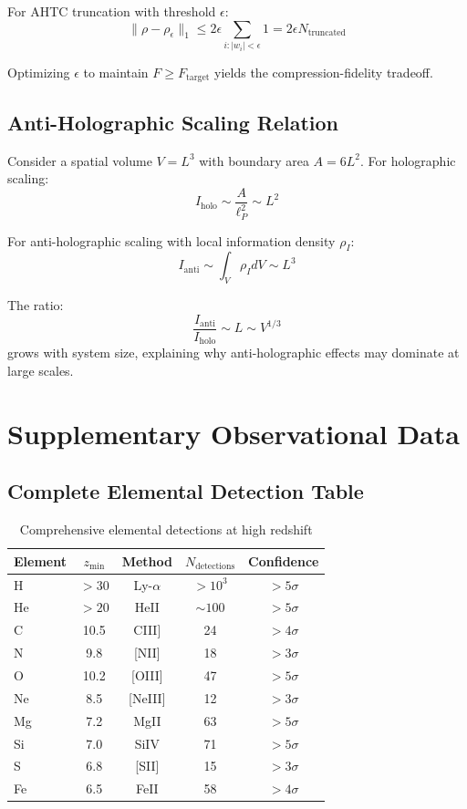 \documentclass[twocolumn,aps,prd,superscriptaddress,nofootinbib]{revtex4-2}
\begin{document}
For AHTC truncation with threshold $\epsilon$:
\begin{equation}
\|\rho - \rho_\epsilon\|_1 \leq 2\epsilon \sum_{i : |w_i| < \epsilon} 1 = 2\epsilon N_{\text{truncated}}
\end{equation}

Optimizing $\epsilon$ to maintain $F \geq F_{\text{target}}$ yields the compression-fidelity tradeoff.

\subsection{Anti-Holographic Scaling Relation}

Consider a spatial volume $V = L^3$ with boundary area $A = 6L^2$. For holographic scaling:
\begin{equation}
I_{\text{holo}} \sim \frac{A}{\ell_P^2} \sim L^2
\end{equation}

For anti-holographic scaling with local information density $\rho_I$:
\begin{equation}
I_{\text{anti}} \sim \int_V \rho_I dV \sim L^3
\end{equation}

The ratio:
\begin{equation}
\frac{I_{\text{anti}}}{I_{\text{holo}}} \sim L \sim V^{1/3}
\end{equation}
grows with system size, explaining why anti-holographic effects may dominate at large scales.

\section{Supplementary Observational Data}

\subsection{Complete Elemental Detection Table}

\begin{table}[htbp]
\centering
\caption{Comprehensive elemental detections at high redshift}
\label{tab:complete_elements}
\begin{tabular}{lcccc}
\toprule
Element & $z_{\min}$ & Method & $N_{\text{detections}}$ & Confidence \\
\midrule
H & $>30$ & Ly-$\alpha$ & $>10^3$ & $>5\sigma$ \\
He & $>20$ & HeII & $\sim100$ & $>5\sigma$ \\
C & 10.5 & CIII] & 24 & $>4\sigma$ \\
N & 9.8 & [NII] & 18 & $>3\sigma$ \\
O & 10.2 & [OIII] & 47 & $>5\sigma$ \\
Ne & 8.5 & [NeIII] & 12 & $>3\sigma$ \\
Mg & 7.2 & MgII & 63 & $>5\sigma$ \\
Si & 7.0 & SiIV & 71 & $>5\sigma$ \\
S & 6.8 & [SII] & 15 & $>3\sigma$ \\
Fe & 6.5 & FeII & 58 & $>4\sigma$ \\
\bottomrule
\end{tabular}
\end{table}
\end{document}
